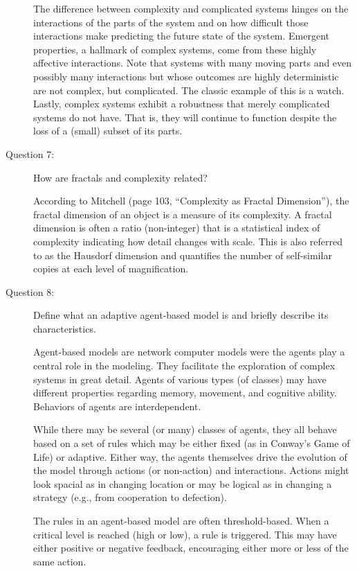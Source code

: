 \documentclass[letterpaper,10pt]{article}
\begin{document}
\begin{description}
  The difference between complexity and complicated systems hinges on the interactions of the parts of the system and on how difficult those interactions make predicting the future state of the system.  Emergent properties, a hallmark of complex systems, come from these highly affective interactions.  Note that systems with many moving parts and even possibly many interactions but whose outcomes are highly deterministic are not complex, but complicated.  The classic example of
  this is a watch.  Lastly, complex systems exhibit a robustness that merely complicated systems do not have.  That is, they will continue to function despite the loss of a (small) subset of its parts.

\item[Question 7:]
How are fractals and complexity related?

According to Mitchell (page 103, ``Complexity as Fractal Dimension''), the fractal dimension of an object is a measure of its complexity.  A fractal dimension is often a ratio (non-integer) that is a statistical index of complexity indicating how detail changes with scale.  This is also referred to as the Hausdorf dimension and quantifies the number of self-similar copies at each level of magnification.

\item[Question 8:]
Define what an adaptive agent-based model is and briefly describe its characteristics.

Agent-based models are network computer models  were the agents play a central role in the modeling. They facilitate the exploration of complex systems in great detail.  Agents of various types (of classes) may have different properties regarding memory, movement, and cognitive ability.  Behaviors of agents are interdependent.

While there may be several (or many) classes of agents, they all behave based on a set of rules which may be either fixed (as in Conway's Game of Life) or adaptive.  Either way, the agents themselves drive the evolution of the model through actions (or non-action) and interactions.  Actions might look spacial as in changing location or may be logical as in changing a strategy (e.g., from cooperation to defection).

The rules in an agent-based model are often threshold-based.  When a critical level is reached (high or low), a rule is triggered.  This may have either positive or negative feedback, encouraging either more or less of the same action.


\end{description}
\end{document}
